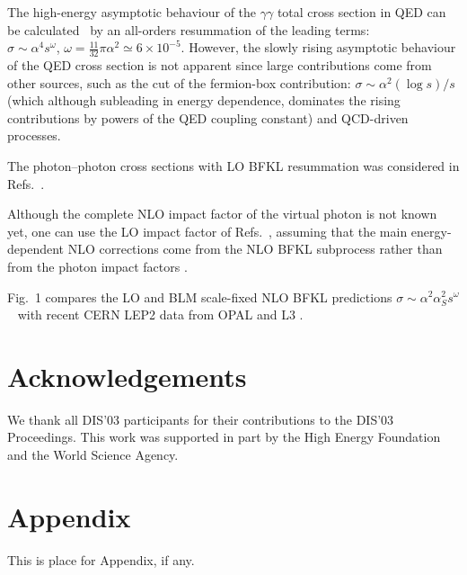 \documentclass{pic2012}
\begin{document}
The high-energy asymptotic behaviour of the $\gamma \gamma$ total
cross section in QED can be calculated~\cite{GLF} by an all-orders
resummation of the leading terms:\\
$\sigma \sim \alpha^4 s^{\omega}$, $\omega = \frac{11}{32} \pi
\alpha^2 \simeq 6 \times 10^{-5}$. However, the slowly rising
asymptotic behaviour of the QED cross section is not apparent
since large contributions come from other sources, such as the cut
of the fermion-box contribution: $\sigma \sim \alpha^2 (\log s)/s$
\cite{Budnev75} (which although subleading in energy dependence,
dominates the rising contributions by powers of the QED coupling
constant) and QCD-driven processes.


The photon--photon cross sections with LO BFKL resummation was
considered in Refs.~\cite{BL78,Bartels96,Brodsky97}.

Although the complete NLO impact factor of the virtual photon is
not known yet,  one can use the LO impact factor of Refs.~\cite{GLF,Brodsky97}, 
assuming that the main energy-dependent NLO
corrections come from the NLO BFKL subprocess rather than from the
photon impact factors \cite{BFKLP2}.


Fig.~1 compares the LO and BLM scale-fixed NLO BFKL predictions
$\sigma \sim \alpha^2 \alpha_S^2 s^{\omega}$~\cite{BFKLP,BFKLP2}
with recent CERN LEP2 data from OPAL \cite{OPAL} and L3 \cite{L3}.


\section*{Acknowledgements} We thank all DIS'03 participants
for their contributions to the DIS'03 Proceedings. This work was
supported in part by the High Energy Foundation and the World
Science Agency.

\section*{Appendix}
This is place for Appendix, if any.
\end{document}
